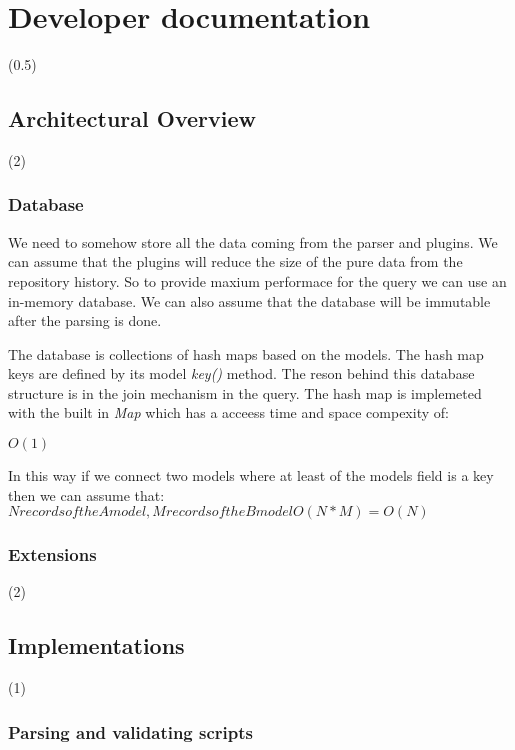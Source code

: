 \chapter{Developer documentation}
\label{ch:impl}

(0.5)

\section{Architectural Overview}

(2)

\subsection{Database}

We need to somehow store all the data coming from the parser and plugins. We can assume that the plugins will reduce the size of the
pure data from the repository history. So to provide maxium performace for the query we can use an in-memory database. 
We can also assume that the database will be immutable after the parsing is done. 

The database is collections of hash maps based on the models. The hash map keys are defined by its model \textit{key()} method.
The reson behind this database structure is in the join mechanism in the query. The hash map is implemeted with the built in 
\textit{Map} \cite{map} which has a acceess time and space compexity of:

\( O(1) \)

In this way if we connect two models where at least of the models field is a key then we can assume that:
\(
    N records of the A model, M records of the B model

    O(N * M) = O(N)

\)

\subsection{Extensions}

(2)

\section{Implementations}

(1)

\subsection{Parsing and validating scripts}

